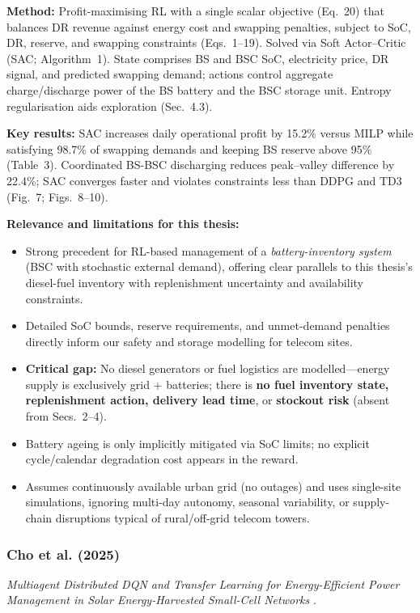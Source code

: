 \textbf{Method:} Profit-maximising RL with a single scalar objective (Eq.~20) that balances DR revenue against energy cost and swapping penalties, subject to SoC, DR, reserve, and swapping constraints (Eqs.~1--19). Solved via Soft Actor--Critic (SAC; Algorithm~1). State comprises BS and BSC SoC, electricity price, DR signal, and predicted swapping demand; actions control aggregate charge/discharge power of the BS battery and the BSC storage unit. Entropy regularisation aids exploration (Sec.~4.3).

\textbf{Key results:} SAC increases daily operational profit by 15.2\% versus MILP while satisfying 98.7\% of swapping demands and keeping BS reserve above 95\% (Table~3). Coordinated BS-BSC discharging reduces peak--valley difference by 22.4\%; SAC converges faster and violates constraints less than DDPG and TD3 (Fig.~7; Figs.~8--10).

\textbf{Relevance and limitations for this thesis:}
\begin{itemize}
    \item Strong precedent for RL-based management of a \emph{battery-inventory system} (BSC with stochastic external demand), offering clear parallels to this thesis's diesel-fuel inventory with replenishment uncertainty and availability constraints.
    \item Detailed SoC bounds, reserve requirements, and unmet-demand penalties directly inform our safety and storage modelling for telecom sites.
    \item \textbf{Critical gap:} No diesel generators or fuel logistics are modelled—energy supply is exclusively grid + batteries; there is \textbf{no fuel inventory state, replenishment action, delivery lead time}, or \textbf{stockout risk} (absent from Secs.~2--4).
    \item Battery ageing is only implicitly mitigated via SoC limits; no explicit cycle/calendar degradation cost appears in the reward.
    \item Assumes continuously available urban grid (no outages) and uses single-site simulations, ignoring multi-day autonomy, seasonal variability, or supply-chain disruptions typical of rural/off-grid telecom towers.
\end{itemize}

\subsubsection{Cho et al. (2025)}
\label{sec:cho-et-al}
\textit{Multiagent Distributed DQN and Transfer Learning for Energy-Efficient Power Management in Solar Energy-Harvested Small-Cell Networks} \cite{cho_2025_solar_smallcell_ddqn}.

